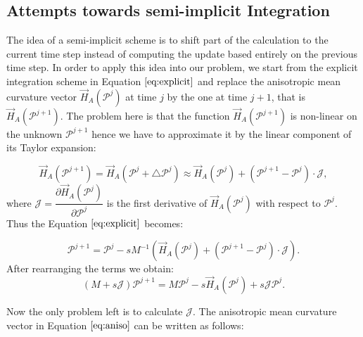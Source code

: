 \documentclass[11pt]{article}
\begin{document}
\begin{appendices}
\section{Attempts towards semi-implicit Integration}
\label{apx:implicit}

The idea of a semi-implicit scheme is to shift part of the calculation to the current time step instead of computing the update based entirely on the previous time step. In order to apply this idea into our problem, we start from the explicit integration scheme in Equation $\ref{eq:explicit}$ and replace the anisotropic mean curvature vector $\vec{H}_A(\mathcal{P}^j)$ at time $j$ by the one at time $j+1$, that is $\vec{H}_A(\mathcal{P}^{j+1})$. The problem here is that the function $\vec{H}_A(\mathcal{P}^{j+1})$ is non-linear on the unknown $\mathcal{P}^{j+1}$ hence we have to approximate it by the linear component of its Taylor expansion:

\begin{equation}
\vec{H}_A(\mathcal{P}^{j+1}) = \vec{H}_A(\mathcal{P}^{j} + \bigtriangleup \mathcal{P}^j) \approx \vec{H}_A(\mathcal{P}^{j}) + (\mathcal{P}^{j+1} - \mathcal{P}^{j}) \cdot \mathcal{J},
\end{equation}
where $\mathcal{J} = \dfrac{\partial\vec{H}_A(\mathcal{P}^{j})}{\partial\mathcal{P}^{j}}$ is the first derivative of $\vec{H}_A(\mathcal{P}^{j})$ with respect to $\mathcal{P}^{j}$. Thus the Equation $\ref{eq:explicit}$ becomes:

\begin{equation}
\mathcal{P}^{j+1} = \mathcal{P}^{j} - sM^{-1}\left( \vec{H}_A(\mathcal{P}^{j}) + (\mathcal{P}^{j+1} - \mathcal{P}^{j}) \cdot \mathcal{J} \right) .
\end{equation}
After rearranging the terms we obtain:
\begin{equation}
(M + s\mathcal{J})\mathcal{P}^{j+1} = M\mathcal{P}^{j} - s\vec{H}_A(\mathcal{P}^{j}) + s\mathcal{J}\mathcal{P}^j .
\label{eq:implicit_form}
\end{equation}

Now the only problem left is to calculate $\mathcal{J}$. The anisotropic mean curvature vector in Equation $\ref{eq:aniso}$ can be written as follows:


\end{appendices}
\end{document}
